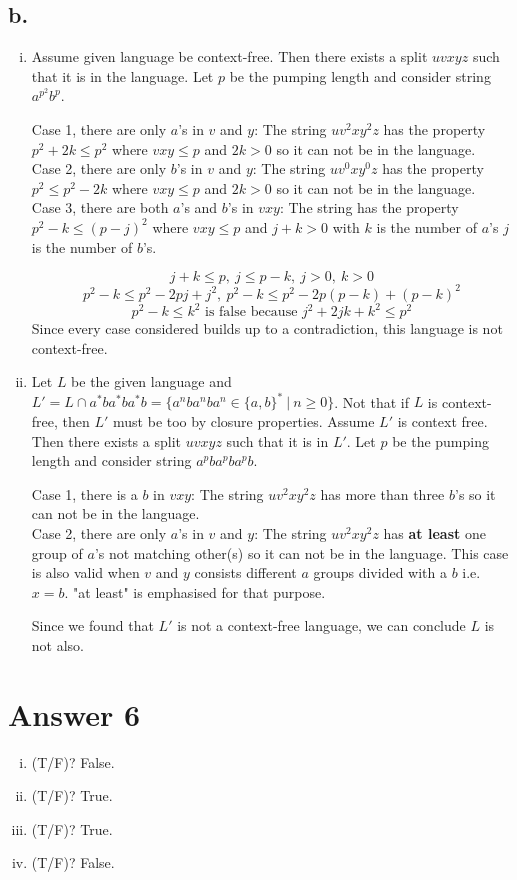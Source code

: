 \documentclass[12pt]{article}
\begin{document}
\subsection*{b.}
\begin{enumerate}[(i)]
\item 
	\qquad Assume given language be context-free. Then there exists a split $uvxyz$ such that it is in the language. Let $p$ be the pumping length and consider string $a^{p^2}b^p$.
	\begin{center}
		Case 1, there are only $a$'s in $v$ and $y$: The string $uv^2xy^2z$ has the property $p^2+2k \leq p^2$ where $vxy \leq p$ and $2k > 0$ so it can not be in the language.\\
		Case 2, there are only $b$'s in $v$ and $y$: The string $uv^0xy^0z$ has the property $p^2 \leq p^2-2k$ where $vxy \leq p$ and $2k > 0$ so it can not be in the language.\\
		Case 3, there are both $a$'s and $b$'s in $vxy$: The string has the property $p^2 - k \leq (p-j)^2$ where $vxy \leq p$ and $j+k > 0$ with $k$ is the number of $a$'s $j$ is the number of $b$'s.
	\end{center}
	\vspace{-0.4cm}
	$$j+k \leq p,\ j \leq p-k,\ j>0,\ k>0$$
	$$p^2 - k \leq p^2 - 2pj +j^2,\ p^2 - k \leq p^2 - 2p(p-k) + (p-k)^2$$
	$$p^2 - k \leq k^2 \text{ is false because } j^2 + 2jk + k^2 \leq p^2$$
	Since every case considered builds up to a contradiction, this language is not context-free.

\item 
	\qquad Let $L$ be the given language and $L' = L \cap a^*ba^*ba^*b = \{a^nba^nba^n \in \{a,b\}^*\ |\ n\geq 0\}$. Not that if $L$ is context-free, then $L'$ must be too by closure properties. Assume $L'$ is context free. Then there exists a split $uvxyz$ such that it is in $L'$. Let $p$ be the pumping length and consider string $a^pba^pba^pb$.
	\begin{center}
		Case 1, there is a $b$ in $vxy$: The string $uv^2xy^2z$ has more than three $b$'s so it can not be in the language.\\
		Case 2, there are only $a$'s in $v$ and $y$: The string $uv^2xy^2z$ has \textbf{at least} one group of $a$'s not matching other(s) so it can not be in the language. This case is also valid when $v$ and $y$ consists different $a$ groups divided with a $b$ i.e. $x = b$. "at least" is emphasised for that purpose.
	\end{center}
	\qquad Since we found that $L'$ is not a context-free language, we can conclude $L$ is not also.
\end{enumerate}


\section*{Answer 6}
\begin{enumerate}[(i)]
\item (T/F)? False.
\item (T/F)? True.
\item (T/F)? True.
\item (T/F)? False.
\end{enumerate}

\end{document}
